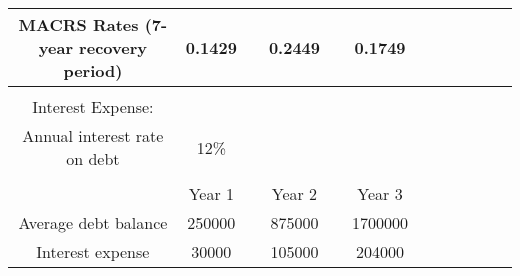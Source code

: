 {\begin{longtable}[c]{|c|c|c|c|c|c|c|c|c|c|c|c|}
\hline
MACRS Rates (7-year recovery period)                                                                                            & 0.1429                            &  & 0.2449       &  & 0.1749    &  &           &  &           &  &           \\
\hline
                                                                                                                                &                                   &  &              &  &           &  &           &  &           &  &           \\
\hline
Interest Expense:                                                                                                               &                                   &  &              &  &           &  &           &  &           &  &           \\
\hline
Annual interest rate on debt                                                                                                    & 12\%                               &  &              &  &           &  &           &  &           &  &           \\
\hline
                                                                                                                                &                                   &  &              &  &           &  &           &  &           &  &           \\
\hline
                                                                                                                                & Year 1                            &  & Year 2       &  & Year 3    &  &           &  &           &  &           \\
\hline
Average debt balance                                                                                                            & 250000                            &  & 875000       &  & 1700000   &  &           &  &           &  &           \\
\hline
Interest expense                                                                                                                & 30000                             &  & 105000       &  & 204000    &  &           &  &           &  &           \\
\hline
\hline
\end{longtable}
}
